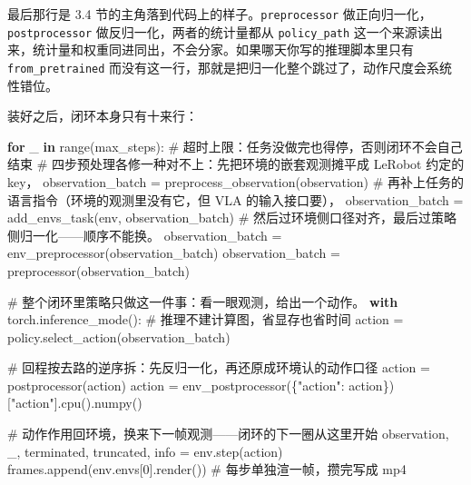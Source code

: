 \documentclass[
  chinese,
]{ctexart}
\newenvironment{Shaded}{\begin{snugshade}}{\end{snugshade}}
\newcommand{\BuiltInTok}[1]{\textcolor[rgb]{0.00,0.23,0.31}{#1}}
\newcommand{\CommentTok}[1]{\textcolor[rgb]{0.37,0.37,0.37}{#1}}
\newcommand{\ControlFlowTok}[1]{\textcolor[rgb]{0.00,0.23,0.31}{\textbf{#1}}}
\newcommand{\DecValTok}[1]{\textcolor[rgb]{0.68,0.00,0.00}{#1}}
\newcommand{\KeywordTok}[1]{\textcolor[rgb]{0.00,0.23,0.31}{\textbf{#1}}}
\newcommand{\NormalTok}[1]{\textcolor[rgb]{0.00,0.23,0.31}{#1}}
\newcommand{\OperatorTok}[1]{\textcolor[rgb]{0.37,0.37,0.37}{#1}}
\newcommand{\StringTok}[1]{\textcolor[rgb]{0.13,0.47,0.30}{#1}}
\begin{document}
最后那行是 3.4 节的主角落到代码上的样子。\texttt{preprocessor}
做正向归一化，\texttt{postprocessor} 做反归一化，两者的统计量都从
\texttt{policy\_path}
这一个来源读出来，统计量和权重同进同出，不会分家。如果哪天你写的推理脚本里只有
\texttt{from\_pretrained}
而没有这一行，那就是把归一化整个跳过了，动作尺度会系统性错位。

装好之后，闭环本身只有十来行：

\begin{Shaded}
\begin{Highlighting}[]
        \ControlFlowTok{for}\NormalTok{ \_ }\KeywordTok{in} \BuiltInTok{range}\NormalTok{(max\_steps):    }\CommentTok{\# 超时上限：任务没做完也得停，否则闭环不会自己结束}
            \CommentTok{\# 四步预处理各修一种对不上：先把环境的嵌套观测摊平成 LeRobot 约定的 key，}
\NormalTok{            observation\_batch }\OperatorTok{=}\NormalTok{ preprocess\_observation(observation)}
            \CommentTok{\# 再补上任务的语言指令（环境的观测里没有它，但 VLA 的输入接口要），}
\NormalTok{            observation\_batch }\OperatorTok{=}\NormalTok{ add\_envs\_task(env, observation\_batch)}
            \CommentTok{\# 然后过环境侧口径对齐，最后过策略侧归一化——顺序不能换。}
\NormalTok{            observation\_batch }\OperatorTok{=}\NormalTok{ env\_preprocessor(observation\_batch)}
\NormalTok{            observation\_batch }\OperatorTok{=}\NormalTok{ preprocessor(observation\_batch)}

            \CommentTok{\# 整个闭环里策略只做这一件事：看一眼观测，给出一个动作。}
            \ControlFlowTok{with}\NormalTok{ torch.inference\_mode():    }\CommentTok{\# 推理不建计算图，省显存也省时间}
\NormalTok{                action }\OperatorTok{=}\NormalTok{ policy.select\_action(observation\_batch)}

            \CommentTok{\# 回程按去路的逆序拆：先反归一化，再还原成环境认的动作口径}
\NormalTok{            action }\OperatorTok{=}\NormalTok{ postprocessor(action)}
\NormalTok{            action }\OperatorTok{=}\NormalTok{ env\_postprocessor(\{}\StringTok{"action"}\NormalTok{: action\})[}\StringTok{"action"}\NormalTok{].cpu().numpy()}

            \CommentTok{\# 动作作用回环境，换来下一帧观测——闭环的下一圈从这里开始}
\NormalTok{            observation, \_, terminated, truncated, info }\OperatorTok{=}\NormalTok{ env.step(action)}
\NormalTok{            frames.append(env.envs[}\DecValTok{0}\NormalTok{].render())    }\CommentTok{\# 每步单独渲一帧，攒完写成 mp4}
\end{Highlighting}
\end{Shaded}
\end{document}
